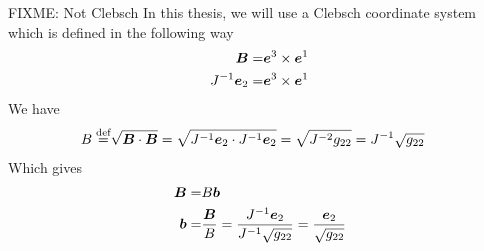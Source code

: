 FIXME: Not Clebsch
In this thesis, we will use a Clebsch coordinate system which is defined in the following way
%
\begin{align*}
    \boldsymbol{B}
    =&\boldsymbol{e}^3 \times \boldsymbol{e}^1\\
    J^{-1}\boldsymbol{e}_2=&\boldsymbol{e}^3 \times \boldsymbol{e}^1
\end{align*}
%
We have
%
\begin{align*}
    B\overset{\text{def}}{=} & \sqrt{\boldsymbol{B}\cdot\boldsymbol{B}}
    = \sqrt{J^{-1}\boldsymbol{e}_2\cdot J^{-1}\boldsymbol{e}_2}
    = \sqrt{J^{-2}g_{22}}
    = J^{-1}\sqrt{g_{22}}
\end{align*}
%
Which gives
%
\begin{align*}
    \boldsymbol{B}=&B\boldsymbol{b}\\
    \boldsymbol{b}=&\frac{\boldsymbol{B}}{B}
          =\frac{J^{-1}\boldsymbol{e}_2}{J^{-1}\sqrt{g_{22}}}
          =\frac{\boldsymbol{e}_2}{\sqrt{g_{22}}}
\end{align*}
